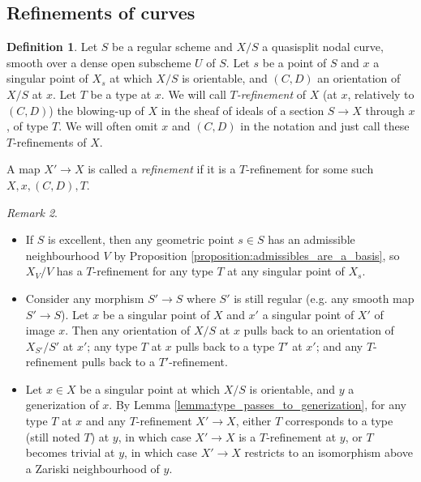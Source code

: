 \documentclass[a4paper,12pt]{amsart} %
\numberwithin{equation}{subsection}
\theoremstyle{definition}
\newtheorem{definition}{Definition}[section]
\theoremstyle{plain}%
\theoremstyle{remark}
\newtheorem{remark}[definition]{Remark}
\begin{document}
\subsection{Refinements of curves}


\begin{definition}\label{definition refinement}
Let $S$ be a regular scheme and $X/S$ a quasisplit nodal curve, smooth over a dense open subscheme $U$ of $S$. Let $s$ be a point of $S$ and $x$ a singular point of $X_s$ at which $X/S$ is orientable, and $(C,D)$ an orientation of $X/S$ at $x$. Let $T$ be a type at $x$. We will call \emph{$T$-refinement} of $X$ (at $x$, relatively to $(C,D)$) the blowing-up of $X$ in the sheaf of ideals of a section $S\to X$ through $x$, of type $T$. We will often omit $x$ and $(C,D)$ in the notation and just call these $T$-refinements of $X$.

A map $X'\to X$ is called a \emph{refinement} if it is a $T$-refinement for some such $X,x,(C,D),T$.
\end{definition}

\begin{remark}\label{remarque les raffinements asymetriques existent et-localement et base change compatibles}
\begin{itemize}
\item If $S$ is excellent, then any geometric point $s\in S$ has an admissible neighbourhood $V$ by Proposition \ref{proposition:admissibles_are_a_basis}, so $X_V/V$ has a $T$-refinement for any type $T$ at any singular point of $X_s$.
\item Consider any morphism $S' \to S$ where $S'$ is still regular (e.g. any smooth map $S' \to S$). Let $x$ be a singular point of $X$ and $x'$ a singular point of $X'$ of image $x$. Then any orientation of $X/S$ at $x$ pulls back to an orientation of $X_{S'}/S'$ at $x'$; any type $T$ at $x$ pulls back to a type $T'$ at $x'$; and any $T$-refinement pulls back to a $T'$-refinement.
\item Let $x \in X$ be a singular point at which $X/S$ is orientable, and $y$ a generization of $x$. By Lemma \ref{lemma:type_passes_to_generization}, for any type $T$ at $x$ and any $T$-refinement $X'\to X$, either $T$ corresponds to a type (still noted $T$) at $y$, in which case $X'\to X$ is a $T$-refinement at $y$, or $T$ becomes trivial at $y$, in which case $X'\to X$ restricts to an isomorphism above a Zariski neighbourhood of $y$.
\end{itemize}
\end{remark}
\end{document}
